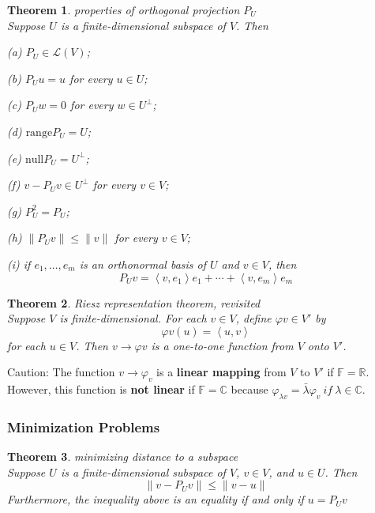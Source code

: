\documentclass{article}
\newtheorem{theorem}{Theorem}[subsection]
\newcommand{\RR}{\mathbb{R}}
\newcommand{\CC}{\mathbb{C}}
\newcommand{\FF}{\mathbb{F}}
\newcommand{\range}{\text{range}}
\newcommand{\n}{\text{null}}
\begin{document}
\begin{CJK}{UTF8}{gkai}
\begin{theorem}
    properties of orthogonal projection $P_U$\\

    Suppose $U$ is a finite-dimensional subspace of $V$. Then

    (a) $P_U \in \mathcal{L}(V)$;

    (b) $P_U u = u$ for every $u \in U$;

    (c) $P_Uw = 0$ for every $w \in U^\bot$;

    (d) $\range P_U = U$;

    (e) $\n P_U = U^\bot$;

    (f) $v - P_U v  \in U^\bot$ for every $v \in V$;

    (g) $P_U^2 = P_U$;

    (h) $\|P_Uv\| \leq \|v\|$ for every $v \in V$;

    (i) if $e_1,\ldots,e_m$ is an orthonormal basis of $U$ and $v \in V$, then
    \[P_Uv = \left<v,e_1\right>e_1 + \cdots+\left<v,e_m\right>e_m\]
\end{theorem}

\begin{theorem}
    Riesz representation theorem, revisited\\

    Suppose $V$ is finite-dimensional. For each $v \in V$, define $\varphi v \in V'$ by
    \[\varphi v(u) = \left<u,v\right>\]
    for each $u \in V$. Then $v \to \varphi v$ is a one-to-one function from $V$ onto $V'$.
\end{theorem}

Caution: The function $v \to \varphi_v$ is a \textbf{linear mapping} from $V$ to $V'$ if $\FF = \RR$. However, this function is \textbf{not linear} if $\FF = \CC$ because $\varphi_{\lambda v} = \bar{\lambda} \varphi_v ~if~ \lambda  \in \CC$.

\subsubsection{Minimization Problems}

\begin{theorem}
    minimizing distance to a subspace\\

    Suppose $U$ is a finite-dimensional subspace of $V$, $v \in V$, and $u \in U$. Then
    \[\|v - P_U v \| \leq \|v- u\|\]
    Furthermore, the inequality above is an equality if and only if $u = P_Uv$
\end{theorem}


\end{CJK}
\end{document}
